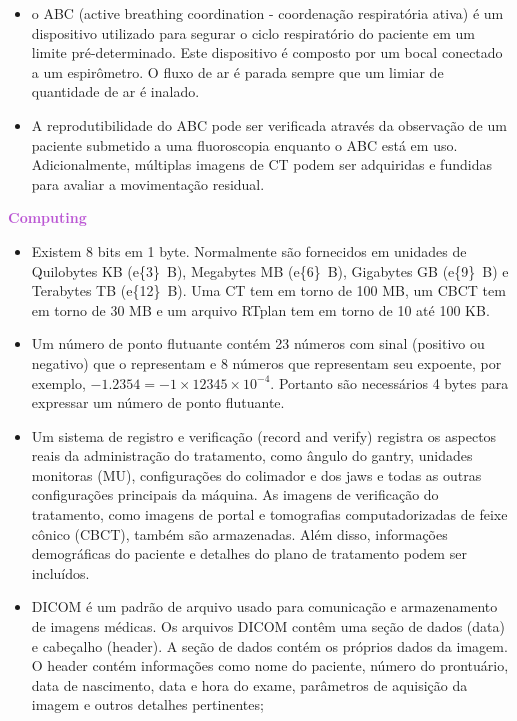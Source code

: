 \documentclass[11pt,a4paper]{article}
\newcounter{exemplo}
\begin{document}
\begin{exemplo}
\begin{itemize}
        \item o ABC (active breathing coordination - coordenação respiratória ativa) é um dispositivo utilizado para segurar o ciclo respiratório do paciente em um limite pré-determinado. Este dispositivo é composto por um bocal conectado a um espirômetro. O fluxo de ar é parada sempre que um limiar de quantidade de ar é inalado.
        
        \item A reprodutibilidade do ABC pode ser verificada através da observação de um paciente submetido a uma fluoroscopia enquanto o ABC está em uso. Adicionalmente, múltiplas imagens de CT podem ser adquiridas e fundidas para avaliar a movimentação residual.
        
    \end{itemize}

    \textcolor{MediumOrchid}{\LobsterTwo\textbf{Computing}}
    \begin{itemize}
        \item Existem 8 bits em 1 byte. Normalmente são fornecidos em unidades de Quilobytes KB (\qty{e{3}}{B}), Megabytes MB (\qty{e{6}}{B}), Gigabytes GB (\qty{e{9}}{B}) e Terabytes TB (\qty{e{12}}{B}). Uma CT tem em torno de 100 MB, um CBCT tem em torno de 30 MB e um arquivo RTplan tem em torno de 10 até 100 KB.
        
        \item Um número de ponto flutuante contém 23 números com sinal (positivo ou negativo)  que o representam e 8 números que representam seu expoente, por exemplo, $-1.2354 = -1 \times 12345 \times 10^{-4}$. Portanto são necessários 4 bytes para expressar um número de ponto flutuante.
        
        \item Um sistema de registro e verificação (record and verify) registra os aspectos reais da administração do tratamento, como ângulo do gantry, unidades monitoras (MU), configurações do colimador e dos jaws e todas as outras configurações principais da máquina. As imagens de verificação do tratamento, como imagens de portal e tomografias computadorizadas de feixe cônico (CBCT), também são armazenadas. Além disso, informações demográficas do paciente e detalhes do plano de tratamento podem ser incluídos.
        
        \item DICOM é um padrão de arquivo usado para comunicação e armazenamento de imagens médicas. Os arquivos DICOM contêm uma seção de dados (data) e cabeçalho (header). A seção de dados contém os próprios dados da imagem. O header contém informações como nome do paciente, número do prontuário, data de nascimento, data e hora do exame, parâmetros de aquisição da imagem e outros detalhes pertinentes;
        

\end{itemize}
\end{exemplo}
\end{document}

